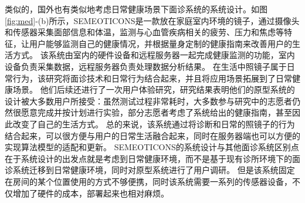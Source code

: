 类似的，国外也有类似地考虑日常健康场景下面诊系统的系统设计。如图\ref{fig:med}-(b)所示，SEMEOTICONS\cite{andreu2015mirror}是一款放在家庭室内环境的镜子，通过摄像头和传感器采集面部信息和体温，监测与心血管疾病相关的疲劳、压力和焦虑等特征，让用户能够监测自己的健康情况，并根据量身定制的健康指南来改善用户的生活方式。
该系统由室内的硬件设备和远程服务器一起完成健康监测的功能，室内设备负责采集数据，远程服务器负责处理数据分析结果。
在生活中照镜子属于日常行为，该研究将面诊技术和日常行为结合起来，并且将应用场景拓展到了日常健康场景。
他们后续还进行了一次用户体验研究，研究结果表明\cite{coppini2017user}他们的原型系统的设计被大多数用户所接受：虽然测试过程非常耗时，大多数参与研究中的志愿者仍然很愿意完成并按计划进行实验，部分志愿者考虑了系统给出的健康指南，甚至因此改变了自己的生活方式。
总的来说，该系统通过将诊断和日常的照镜子的行为结合起来，可以很方便与用户的日常生活融合起来，同时在服务器端也可以方便的实现算法模型的适配和更新。
SEMEOTICONS的系统设计与其他面诊系统区别点在于系统设计的出发点就是考虑到日常健康环境，而不是基于现有诊所环境下的面诊系统迁移到日常健康环境，同时对原型系统进行了用户调研。
但是该系统固定在房间的某个位置使用的方式不够便携，同时该系统需要一系列的传感器设备，不仅增加了硬件的成本，部署起来也相对麻烦。



